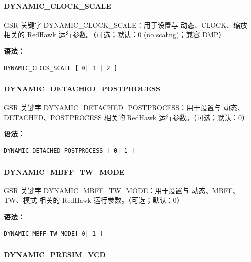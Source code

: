 \paragraph*{DYNAMIC_CLOCK_SCALE}

GSR 关键字 DYNAMIC_CLOCK_SCALE：用于设置与 动态、CLOCK、缩放 相关的 RedHawk 运行参数。（可选；默认：0 (no scaling)；兼容 DMP）

\textbf{语法：}
\begin{lstlisting}
DYNAMIC_CLOCK_SCALE [ 0| 1 | 2 ]
\end{lstlisting}

\subsubsection{}
\paragraph*{DYNAMIC_DETACHED_POSTPROCESS}

GSR 关键字 DYNAMIC_DETACHED_POSTPROCESS：用于设置与 动态、DETACHED、POSTPROCESS 相关的 RedHawk 运行参数。（可选；默认：0）

\textbf{语法：}
\begin{lstlisting}
DYNAMIC_DETACHED_POSTPROCESS [ 0| 1 ]
\end{lstlisting}

\subsubsection{}
\paragraph*{DYNAMIC_MBFF_TW_MODE}

GSR 关键字 DYNAMIC_MBFF_TW_MODE：用于设置与 动态、MBFF、TW、模式 相关的 RedHawk 运行参数。（可选；默认：0）

\textbf{语法：}
\begin{lstlisting}
DYNAMIC_MBFF_TW_MODE[ 0| 1 ]
\end{lstlisting}

\subsubsection{}
\paragraph*{DYNAMIC_PRESIM_VCD}

